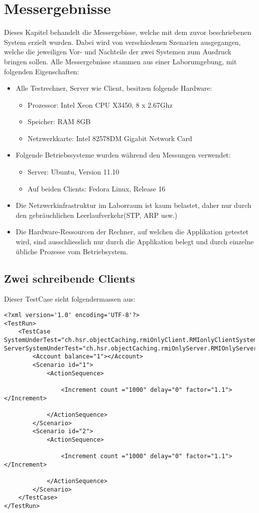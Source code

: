 \chapter{Messergebnisse}

Dieses Kapitel be\-handelt die Mes\-ser\-ge\-bis\-se, welche mit dem zuvor be\-schrie\-benen System erzielt wurden. Dabei wird von verschiedenen Szenarien ausgegangen, welche die jeweiligen Vor- und Nachteile der zwei Systemen zum Ausdruck bringen sollen. \newline
Alle Mes\-ser\-ge\-bnis\-se stam\-men aus einer Labor\-umgebung, mit folgenden Ei\-gen\-schaf\-ten:
\begin{itemize}
\item Alle Testrechner, Server wie Client, besitzen folgende Hardware:
\begin{itemize}
\item Prozessor: Intel Xeon CPU X3450, 8 x 2.67Ghz
\item Speicher: RAM 8GB
\item Netzwerkkarte: Intel 82578DM Gigabit Network Card
\end{itemize}
\item Folgende Betriebssysteme wurden während den Messungen verwendet:
\begin{itemize}
\item Server: Ubuntu, Version 11.10
\item Auf beiden Clients: Fedora Linux, Release 16
\end{itemize}
\item Die Netzwerkinfrastruktur im Laborraum ist kaum belastet, daher nur durch den gebräuchlichen Leerlaufverkehr(STP, ARP usw.)
\item Die Hardware-Ressourcen der Rechner, auf welchen die Applikation getestet wird, sind ausschliesslich nur durch die Applikation belegt und durch einzelne übliche Prozesse vom  Betriebsystem.
\end{itemize}

\section{Zwei schreibende Clients}

Dieser TestCase sieht folgendermassen aus:
\begin{lstlisting}[breaklines=true]
<?xml version='1.0' encoding='UTF-8'?>
<TestRun>
	<TestCase SystemUnderTest="ch.hsr.objectCaching.rmiOnlyClient.RMIonlyClientSystem" ServerSystemUnderTest="ch.hsr.objectCaching.rmiOnlyServer.RMIOnlyServerSystem">
		<Account balance="1"></Account>
		<Scenario id="1">
			<ActionSequence>

				<Increment count ="1000" delay="0" factor="1.1"></Increment>

			</ActionSequence>
		</Scenario>
		<Scenario id="2">
			<ActionSequence>

				<Increment count ="1000" delay="0" factor="1.1"></Increment>

			</ActionSequence>
		</Scenario>
	</TestCase>
</TestRun>
\end{lstlisting}

